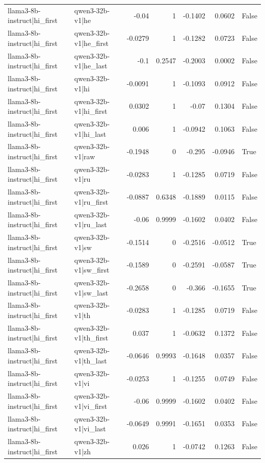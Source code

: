 \begin{table}
\begin{tabular}{l l r r r r l}
llama3-8b-instruct|hi_first & qwen3-32b-v1|he & -0.04 & 1 & -0.1402 & 0.0602 & False \\
llama3-8b-instruct|hi_first & qwen3-32b-v1|he_first & -0.0279 & 1 & -0.1282 & 0.0723 & False \\
llama3-8b-instruct|hi_first & qwen3-32b-v1|he_last & -0.1 & 0.2547 & -0.2003 & 0.0002 & False \\
llama3-8b-instruct|hi_first & qwen3-32b-v1|hi & -0.0091 & 1 & -0.1093 & 0.0912 & False \\
llama3-8b-instruct|hi_first & qwen3-32b-v1|hi_first & 0.0302 & 1 & -0.07 & 0.1304 & False \\
llama3-8b-instruct|hi_first & qwen3-32b-v1|hi_last & 0.006 & 1 & -0.0942 & 0.1063 & False \\
llama3-8b-instruct|hi_first & qwen3-32b-v1|raw & -0.1948 & 0 & -0.295 & -0.0946 & True \\
llama3-8b-instruct|hi_first & qwen3-32b-v1|ru & -0.0283 & 1 & -0.1285 & 0.0719 & False \\
llama3-8b-instruct|hi_first & qwen3-32b-v1|ru_first & -0.0887 & 0.6348 & -0.1889 & 0.0115 & False \\
llama3-8b-instruct|hi_first & qwen3-32b-v1|ru_last & -0.06 & 0.9999 & -0.1602 & 0.0402 & False \\
llama3-8b-instruct|hi_first & qwen3-32b-v1|sw & -0.1514 & 0 & -0.2516 & -0.0512 & True \\
llama3-8b-instruct|hi_first & qwen3-32b-v1|sw_first & -0.1589 & 0 & -0.2591 & -0.0587 & True \\
llama3-8b-instruct|hi_first & qwen3-32b-v1|sw_last & -0.2658 & 0 & -0.366 & -0.1655 & True \\
llama3-8b-instruct|hi_first & qwen3-32b-v1|th & -0.0283 & 1 & -0.1285 & 0.0719 & False \\
llama3-8b-instruct|hi_first & qwen3-32b-v1|th_first & 0.037 & 1 & -0.0632 & 0.1372 & False \\
llama3-8b-instruct|hi_first & qwen3-32b-v1|th_last & -0.0646 & 0.9993 & -0.1648 & 0.0357 & False \\
llama3-8b-instruct|hi_first & qwen3-32b-v1|vi & -0.0253 & 1 & -0.1255 & 0.0749 & False \\
llama3-8b-instruct|hi_first & qwen3-32b-v1|vi_first & -0.06 & 0.9999 & -0.1602 & 0.0402 & False \\
llama3-8b-instruct|hi_first & qwen3-32b-v1|vi_last & -0.0649 & 0.9991 & -0.1651 & 0.0353 & False \\
llama3-8b-instruct|hi_first & qwen3-32b-v1|zh & 0.026 & 1 & -0.0742 & 0.1263 & False \\

\end{tabular}
\end{table}
